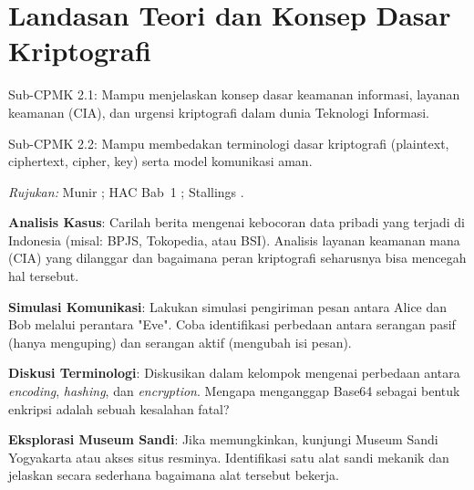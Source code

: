 \documentclass[main.tex]{subfiles}
\begin{document}
\chapter{Landasan Teori dan Konsep Dasar Kriptografi}

\begin{subcpmk}
  \item Sub-CPMK 2.1: Mampu menjelaskan konsep dasar keamanan informasi, layanan keamanan (CIA), dan urgensi kriptografi dalam dunia Teknologi Informasi.
  \item Sub-CPMK 2.2: Mampu membedakan terminologi dasar kriptografi (plaintext, ciphertext, cipher, key) serta model komunikasi aman.
\end{subcpmk}

\noindent\textit{Rujukan:} Munir \cite{munir2019,munir_slides_itb}; HAC Bab~1 \cite{menezes1996,hac_online}; Stallings \cite{stallings2017}.








\begin{aktivitas}
  \item \textbf{Analisis Kasus}: Carilah berita mengenai kebocoran data pribadi yang terjadi di Indonesia (misal: BPJS, Tokopedia, atau BSI). Analisis layanan keamanan mana (CIA) yang dilanggar dan bagaimana peran kriptografi seharusnya bisa mencegah hal tersebut.
  \item \textbf{Simulasi Komunikasi}: Lakukan simulasi pengiriman pesan antara Alice dan Bob melalui perantara "Eve". Coba identifikasi perbedaan antara serangan pasif (hanya menguping) dan serangan aktif (mengubah isi pesan).
  \item \textbf{Diskusi Terminologi}: Diskusikan dalam kelompok mengenai perbedaan antara \textit{encoding}, \textit{hashing}, dan \textit{encryption}. Mengapa menganggap Base64 sebagai bentuk enkripsi adalah sebuah kesalahan fatal?
  \item \textbf{Eksplorasi Museum Sandi}: Jika memungkinkan, kunjungi Museum Sandi Yogyakarta atau akses situs resminya. Identifikasi satu alat sandi mekanik dan jelaskan secara sederhana bagaimana alat tersebut bekerja.
\end{aktivitas}
\end{document}
